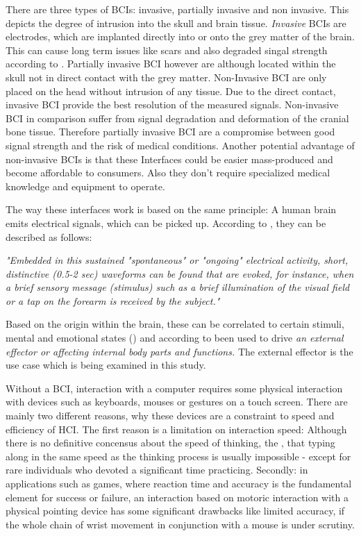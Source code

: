             There are three types of BCIs: invasive, partially invasive and non invasive. This depicts the degree of intrusion into the skull and brain tissue. \textit{Invasive} BCIs are electrodes, which are implanted directly into or onto the grey matter of the brain. This can cause long term issues like scars and also degraded singal strength according to \cite{Abdulkader.2015}. 
            Partially invasive BCI however are although located within the skull not in direct contact with the grey matter.
            Non-Invasive BCI are only placed on the head without intrusion of any tissue.
            Due to the direct contact, invasive BCI provide the best resolution of the measured signals. Non-invasive BCI in comparison suffer from signal degradation and deformation of the cranial bone tissue. 
            Therefore partially invasive BCI are a compromise between good signal strength and the risk of medical conditions.
            Another potential advantage of non-invasive BCIs is that these Interfaces could be easier mass-produced and become affordable to consumers. Also they don't require specialized medical knowledge and equipment to operate.

            The way these interfaces work is based on the same principle: A human brain emits electrical signals, which can be picked up.
            According to \cite{Vidal.1973}, they can be described as follows:

            \medskip
            \emph{"Embedded in this sustained "spontaneous" or "ongoing" electrical activity, short, distinctive (0.5-2 sec) waveforms can be found that are evoked, for instance, when a brief sensory message (stimulus) such as a brief illumination of the visual field or a tap on the forearm is received by the subject."}
            \medskip

            Based on the origin within the brain, these can be correlated to certain stimuli, mental and emotional states (\cite{JardimGoncalves.2018}) and according to \cite{Waldert.2016} been used to drive \emph{an external effector or affecting internal body parts and functions.} The external effector is the use case which is being examined in this study.

            Without a BCI, interaction with a computer requires some physical interaction with devices such as keyboards, mouses or gestures on a touch screen. There are mainly two different reasons, why these devices are a constraint to speed and efficiency of HCI. The first reason is a limitation on interaction speed: Although there is no definitive concensus about the speed of thinking, the , that typing along in the same speed as the thinking process is usually impossible - except for rare individuals who devoted a significant time practicing. Secondly: in applications such as games, where reaction time and accuracy is the fundamental element for success or failure, an interaction based on motoric interaction with a physical pointing device has some significant drawbacks like limited accuracy, if the whole chain of wrist movement in conjunction with a mouse is under scrutiny. 

